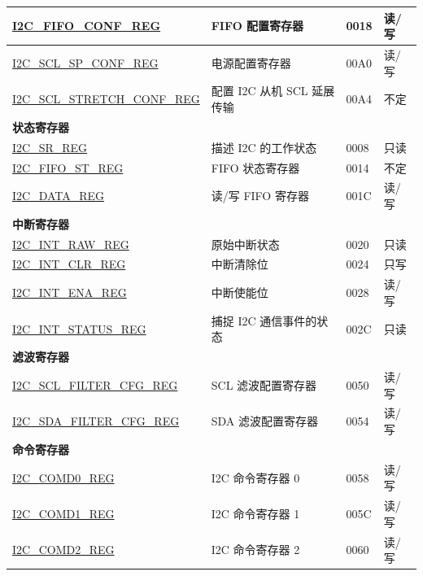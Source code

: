 \begin{longtable}{ | m{6cm} | p{7.2cm} | p{1.3cm} | p{1cm} | }
\hyperref[regdesc:I2CFIFOCONFREG]{I2C\_FIFO\_CONF\_REG} & FIFO 配置寄存器 & \hexprefix{}0018 & 读/写 \\ \hline
\hyperref[regdesc:I2CSCLSPCONFREG]{I2C\_SCL\_SP\_CONF\_REG} & 电源配置寄存器 & \hexprefix{}00A0 & 读/写 \\ \hline
\hyperref[regdesc:I2CSCLSTRETCHCONFREG]{I2C\_SCL\_STRETCH\_CONF\_REG} & 配置 I2C 从机 SCL 延展传输 & \hexprefix{}00A4 & 不定 \\ \hline
\multicolumn{4}{|l|}{\textbf{状态寄存器}} \\ \hline
\hyperref[regdesc:I2CSRREG]{I2C\_SR\_REG} & 描述 I2C 的工作状态 & \hexprefix{}0008 & 只读 \\ \hline
\hyperref[regdesc:I2CFIFOSTREG]{I2C\_FIFO\_ST\_REG} & FIFO 状态寄存器 & \hexprefix{}0014 & 不定 \\ \hline
\hyperref[regdesc:I2CDATAREG]{I2C\_DATA\_REG} & 读/写 FIFO 寄存器 & \hexprefix{}001C & 读/写 \\ \hline
\multicolumn{4}{|l|}{\textbf{中断寄存器}} \\ \hline
\hyperref[regdesc:I2CINTRAWREG]{I2C\_INT\_RAW\_REG} & 原始中断状态 & \hexprefix{}0020 & 只读 \\ \hline
\hyperref[regdesc:I2CINTCLRREG]{I2C\_INT\_CLR\_REG} & 中断清除位 & \hexprefix{}0024 & 只写 \\ \hline
\hyperref[regdesc:I2CINTENAREG]{I2C\_INT\_ENA\_REG} & 中断使能位 & \hexprefix{}0028 & 读/写 \\ \hline
\hyperref[regdesc:I2CINTSTATUSREG]{I2C\_INT\_STATUS\_REG} & 捕捉 I2C 通信事件的状态 & \hexprefix{}002C & 只读 \\ \hline
\multicolumn{4}{|l|}{\textbf{滤波寄存器}} \\ \hline
\hyperref[regdesc:I2CSCLFILTERCFGREG]{I2C\_SCL\_FILTER\_CFG\_REG} & SCL 滤波配置寄存器 & \hexprefix{}0050 & 读/写 \\ \hline
\hyperref[regdesc:I2CSDAFILTERCFGREG]{I2C\_SDA\_FILTER\_CFG\_REG} & SDA 滤波配置寄存器 & \hexprefix{}0054 & 读/写 \\ \hline
\multicolumn{4}{|l|}{\textbf{命令寄存器}} \\ \hline
\hyperref[regdesc:I2CCOMD0REG]{I2C\_COMD0\_REG} & I2C 命令寄存器 0 & \hexprefix{}0058 & 读/写 \\ \hline
\hyperref[regdesc:I2CCOMD1REG]{I2C\_COMD1\_REG} & I2C 命令寄存器 1 & \hexprefix{}005C & 读/写 \\ \hline
\hyperref[regdesc:I2CCOMD2REG]{I2C\_COMD2\_REG} & I2C 命令寄存器 2 & \hexprefix{}0060 & 读/写 \\ \hline

\end{longtable}
